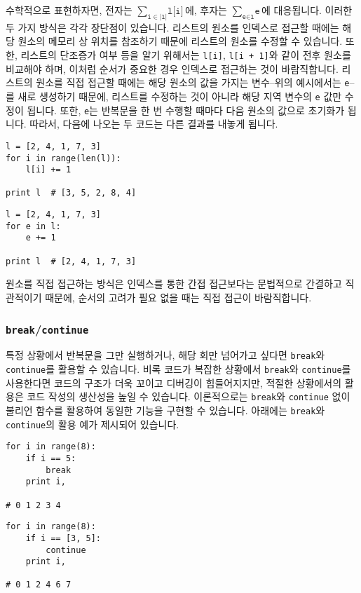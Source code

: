 \documentclass[../main.tex]{subfiles}
\begin{document}
수학적으로 표현하자면, 전자는 $\sum_{\texttt{i} \in |\texttt{l}|} \texttt{l[i]}$에, 후자는 $\sum_{\texttt{e} \in \texttt{l}} \texttt{e}$에 대응됩니다. 이러한 두 가지 방식은 각각 장단점이 있습니다.
리스트의 원소를 인덱스로 접근할 때에는 해당 원소의 메모리 상 위치를 참조하기 때문에 리스트의 원소를 수정할 수 있습니다.
또한, 리스트의 단조증가 여부 등을 알기 위해서는 \texttt{l[i]}, \texttt{l[i + 1]}와 같이 전후 원소를 비교해야 하며, 이처럼 순서가 중요한 경우 인덱스로 접근하는 것이 바람직합니다.
리스트의 원소를 직접 접근할 때에는 해당 원소의 값을 가지는 변수--위의 예시에서는 \texttt{e}--를 새로 생성하기 때문에, 리스트를 수정하는 것이 아니라 해당 지역 변수의 \texttt{e} 값만 수정이 됩니다.
또한, \texttt{e}는 반복문을 한 번 수행할 때마다 다음 원소의 값으로 초기화가 됩니다.
따라서, 다음에 나오는 두 코드는 다른 결과를 내놓게 됩니다.
\begin{verbatim}
l = [2, 4, 1, 7, 3]
for i in range(len(l)):
    l[i] += 1

print l  # [3, 5, 2, 8, 4]
\end{verbatim}
\begin{verbatim}
l = [2, 4, 1, 7, 3]
for e in l:
    e += 1

print l  # [2, 4, 1, 7, 3]
\end{verbatim}
원소를 직접 접근하는 방식은 인덱스를 통한 간접 접근보다는 문법적으로 간결하고 직관적이기 때문에, 순서의 고려가 필요 없을 때는 직접 접근이 바람직합니다.

\subsubsection{\texttt{break}/\texttt{continue}}
특정 상황에서 반복문을 그만 실행하거나, 해당 회만 넘어가고 싶다면 \texttt{break}와 \texttt{continue}를 활용할 수 있습니다.
비록 코드가 복잡한 상황에서 \texttt{break}와 \texttt{continue}를 사용한다면 코드의 구조가 더욱 꼬이고 디버깅이 힘들어지지만, 적절한 상황에서의 활용은 코드 작성의 생산성을 높일 수 있습니다.
이론적으로는 \texttt{break}와 \texttt{continue} 없이 불리언 함수를 활용하여 동일한 기능을 구현할 수 있습니다.
아래에는 \texttt{break}와 \texttt{continue}의 활용 예가 제시되어 있습니다.
\begin{verbatim}
for i in range(8):
    if i == 5:
        break
    print i,

# 0 1 2 3 4
\end{verbatim}
\begin{verbatim}
for i in range(8):
    if i == [3, 5]:
        continue
    print i,

# 0 1 2 4 6 7
\end{verbatim}
\end{document}
